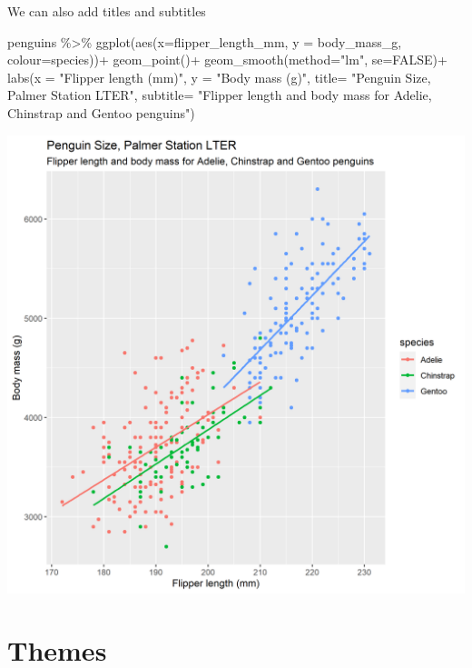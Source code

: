\documentclass[
]{book}
\newenvironment{Shaded}{\begin{snugshade}}{\end{snugshade}}
\newcommand{\AttributeTok}[1]{\textcolor[rgb]{0.77,0.63,0.00}{#1}}
\newcommand{\ConstantTok}[1]{\textcolor[rgb]{0.00,0.00,0.00}{#1}}
\newcommand{\FunctionTok}[1]{\textcolor[rgb]{0.00,0.00,0.00}{#1}}
\newcommand{\NormalTok}[1]{#1}
\newcommand{\SpecialCharTok}[1]{\textcolor[rgb]{0.00,0.00,0.00}{#1}}
\newcommand{\StringTok}[1]{\textcolor[rgb]{0.31,0.60,0.02}{#1}}
\begin{document}
We can also add titles and subtitles

\begin{Shaded}
\begin{Highlighting}[]
\NormalTok{penguins }\SpecialCharTok{\%\textgreater{}\%} 
  \FunctionTok{ggplot}\NormalTok{(}\FunctionTok{aes}\NormalTok{(}\AttributeTok{x=}\NormalTok{flipper\_length\_mm, }
             \AttributeTok{y =}\NormalTok{ body\_mass\_g,}
             \AttributeTok{colour=}\NormalTok{species))}\SpecialCharTok{+} 
  \FunctionTok{geom\_point}\NormalTok{()}\SpecialCharTok{+}
  \FunctionTok{geom\_smooth}\NormalTok{(}\AttributeTok{method=}\StringTok{"lm"}\NormalTok{,    }
              \AttributeTok{se=}\ConstantTok{FALSE}\NormalTok{)}\SpecialCharTok{+}
  \FunctionTok{labs}\NormalTok{(}\AttributeTok{x =} \StringTok{"Flipper length (mm)"}\NormalTok{,}
       \AttributeTok{y =} \StringTok{"Body mass (g)"}\NormalTok{,}
       \AttributeTok{title=} \StringTok{"Penguin Size, Palmer Station LTER"}\NormalTok{,}
       \AttributeTok{subtitle=} \StringTok{"Flipper length and body mass for Adelie, Chinstrap and Gentoo penguins"}\NormalTok{)}
\end{Highlighting}
\end{Shaded}

\includegraphics[width=0.8\linewidth]{images/title}

\hypertarget{themes}{%
\section{Themes}\label{themes}}
\end{document}
